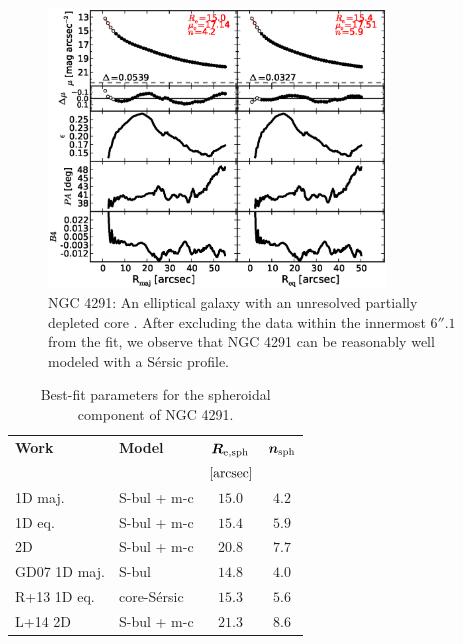 \documentclass[preprint2]{emulateapj}
\newcommand{\fitfigurewidth}{0.8\textwidth}
\begin{document}
  \begin{figure}[h]
  \begin{center}
  \includegraphics[width=\fitfigurewidth]{n4291_1Dfit.eps}
  \caption{NGC 4291: 
  An elliptical galaxy with an unresolved partially depleted core \citep{rusli2013}. %
  After excluding the data within the innermost $6''.1$ from the fit, 
  we observe that NGC 4291 can be reasonably well modeled with a S\'ersic profile.
  }
  \end{center}
  \end{figure}

  \begin{table}[h]
  \small
  \caption{Best-fit parameters for the spheroidal component of NGC 4291.}
  \begin{center}
  \begin{tabular}{llcc}
  \hline
  {\bf Work} & {\bf Model}   & $\bm R_{\rm e,sph}$    & $\bm n_{\rm sph}$ \\
    &  &  $[\rm arcsec]$ & \\
  \hline
  1D maj. & S-bul + m-c & $15.0$  &  $4.2$ \\
  1D eq.  & S-bul + m-c & $15.4$  &  $5.9$ \\
  2D      & S-bul + m-c & $20.8$  &  $7.7$ \\
  \hline
  GD07 1D maj.         & S-bul         & $14.8$  &  $4.0$ \\
  R+13 1D eq.         & core-S\'ersic & $15.3$  &  $5.6$ \\
  L+14 2D         & S-bul + m-c   & $21.3$  &  $8.6$ \\
  \hline
  \end{tabular}
  \end{center}
  \label{tab:n4291}
  \end{table}
\end{document}
